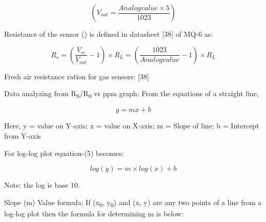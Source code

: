 \begin{equation*}
  ( V_{out}=\frac{Analog value \times 5}{1023})
\end{equation*}


Resistance of the sensor () is defined in datasheet [38] of MQ-6 as:\par

\begin{equation}\label{5.2}
  R_{s}= \left( \frac{V_{cc}}{V_{out}}-1 \right)  \times R_{L}= \left( \frac{1023}{Analog value}-1 \right)  \times R_{L}
\end{equation}

\vspace{\baselineskip}
Fresh air resistance ration for gas sensors: [38]\par

\begin{justify}
Data analyzing from R\textsubscript{S}/R\textsubscript{0} vs ppm graph: From the equations of a straight line,
\end{justify}\par




\begin{equation}\label{5.3}
  y=mx+b
\end{equation}



\begin{justify}
Here, y = value on Y-axis; x = value on X-axis; m = Slope of line; b = Intercept from Y-axis
\end{justify}\par

\begin{justify}
For log-log plot equation-(5) becomes:
\end{justify}\par


\begin{equation}\tag{5.4}
log \left( y \right) =m \times log \left( x \right) +b
\end{equation}
\begin{justify}
Note: the log is base 10.
\end{justify}\par

\begin{justify}
Slope (m) Value formula: If (x\textsubscript{0}, y\textsubscript{0}) and (x, y) are any two points of a line from a log-log plot then the formula for determining m is below:
\end{justify}\par


